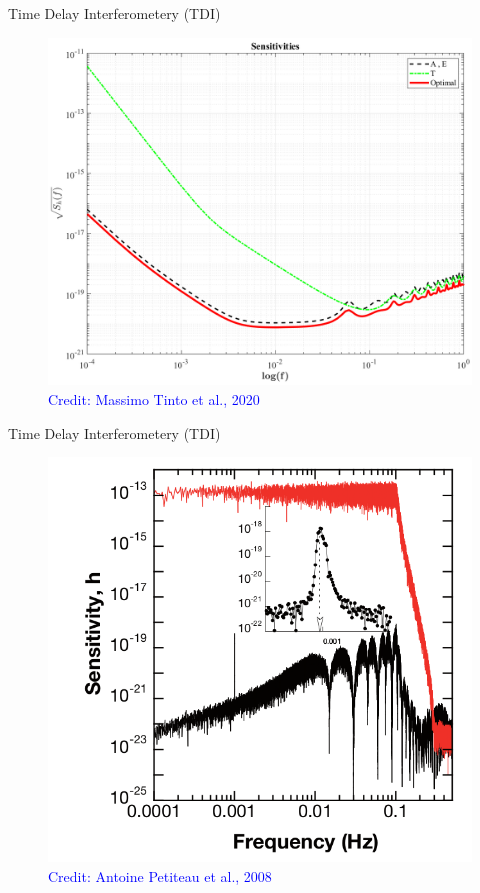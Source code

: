 \documentclass[pdf]{beamer}
\newcommand{\credit}[1]{\tiny{\textcolor{blue}{Credit: #1}}}
\begin{document}
\begin{frame}{Time Delay Interferometery (TDI)}
\begin{figure}
\includegraphics[scale=.2]{fig/AET.png}
\caption*{\credit{Massimo Tinto et al., 2020}}
\end{figure}
\end{frame}

\begin{frame}{Time Delay Interferometery (TDI)}
\begin{figure}
\includegraphics[scale=.26]{fig/TDIeffect.png}
\caption*{\credit{Antoine Petiteau et al., 2008}}
\end{figure}
\end{frame}
\end{document}
